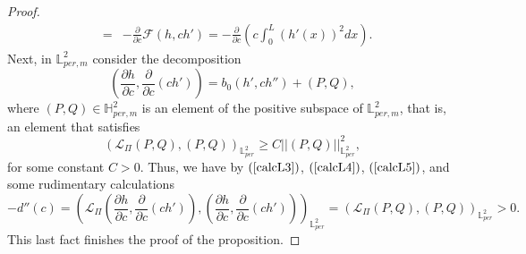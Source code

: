 \documentclass[12pt,reqno,a4paper]{amsart} %
\numberwithin{equation}{section}
\numberwithin{figure}{section}
\begin{document}
\begin{proof}
\begin{equation}
\begin{array}{lllll}
&=&\displaystyle-\frac{\partial }{\partial c}\mathcal{F}(h,ch')=-\frac{\partial }{\partial c}\left(c\int_0^L(h'(x))^2dx\right).
\end{array}
\end{equation}
\indent Next, in $\mathbb{L}_{per,m}^2$ consider the decomposition
\begin{equation}\label{calcL4}\left(\frac{\partial h}{\partial c},\frac{\partial}{\partial c}(ch')\right)=b_0(h',ch'')+(P,Q),
\end{equation}
where $(P,Q)\in\mathbb{H}_{per,m}^2$ is an element of the positive subspace of $\mathbb{L}_{per,m}^2$, that is, an element that satisfies
 \begin{equation}\label{calcL5}
(\mathcal{L}_{\Pi}(P,Q),(P,Q))_{\mathbb{L}_{per}^2}\geq C||(P,Q)||_{\mathbb{L}_{per}^2}^2,
\end{equation}
for some constant $C>0$. Thus, we have by $(\ref{calcL3})$, $(\ref{calcL4})$, $(\ref{calcL5})$, and some rudimentary calculations
$$
-d''(c)=\displaystyle\left(\mathcal{L}_{\Pi}\left(\frac{\partial h}{\partial c},\frac{\partial }{\partial c}(ch')\right),\left(\frac{\partial h}{\partial c},\frac{\partial }{\partial c}(ch')\right)\right)_{\mathbb{L}_{per}^2}=(\mathcal{L}_{\Pi}(P,Q),(P,Q))_{\mathbb{L}_{per}^2}>0.
$$
This last fact finishes the proof of the proposition.

\end{proof}
\end{document}
